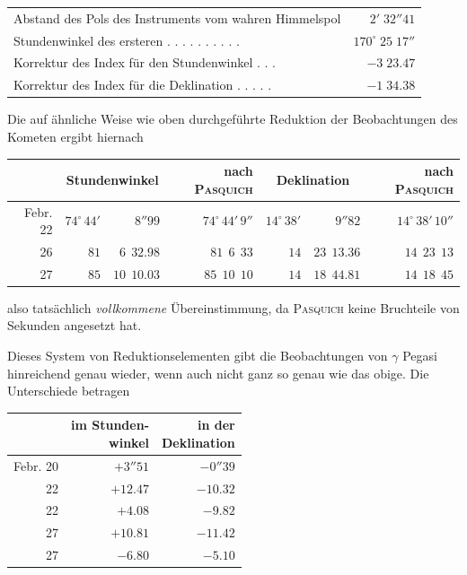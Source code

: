 \begin{center}\footnotesize\setlength{\tabcolsep}{3pt}
\begin{tabular}{@{}l r@{}}
Abstand des Pols des Instruments vom wahren Himmelspol & $2'\;32''41$\\
Stundenwinkel des ersteren . . . . . . . . . . & $170^\circ\;25\;17''$\\
Korrektur des Index für den Stundenwinkel . . . & $-3\;23.47$\\
Korrektur des Index für die Deklination . . . . . & $-1\;34.38$
\end{tabular}\end{center}

Die auf ähnliche Weise wie oben durchgeführte Reduktion der Beobachtungen
des Kometen ergibt hiernach

\begin{center}\footnotesize\setlength{\tabcolsep}{3pt}\begin{tabular}{r | r r | r | r r | r}
 & \multicolumn{2}{c|}{Stundenwinkel} & nach \textsc{Pasquich} & \multicolumn{2}{c|}{Deklination} & nach \textsc{Pasquich} \\
\hline
Febr. 22 & $74^\circ\,44'$ & $8''99$ & $74^\circ\,44'\,9''$ & $14^\circ\,38'$ & $9''82$ & $14^\circ\,38'\,10''$ \\
26 & $81$ & $6\ \ 32.98$ & $81\ \ 6\ \ 33$ & $14$ & $23\ \ 13.36$ & $14\ \ 23\ \ 13$ \\
27 & $85$ & $10\ \ 10.03$ & $85\ \ 10\ \ 10$ & $14$ & $18\ \ 44.81$ & $14\ \ 18\ \ 45$ \\
\end{tabular}\end{center}

also tatsächlich \emph{vollkommene} Übereinstimmung, da \textsc{Pasquich}
keine Bruchteile von Sekunden angesetzt hat.

Dieses System von Reduktionselementen gibt die Beobachtungen von $\gamma$ Pegasi
hinreichend genau wieder, wenn auch nicht ganz so genau wie das obige.
Die Unterschiede betragen

\begin{center}\footnotesize\setlength{\tabcolsep}{4pt}\begin{tabular}{r | r | r}
 & \shortstack{im Stunden-\\winkel} & \shortstack{in der\\Deklination} \\
\hline
Febr. 20 & $+3''51$ & $-0''39$ \\
22 & $+12.47$ & $-10.32$ \\
22 & $+4.08$ & $-9.82$ \\
27 & $+10.81$ & $-11.42$ \\
27 & $-6.80$ & $-5.10$ \\
\end{tabular}\end{center}

